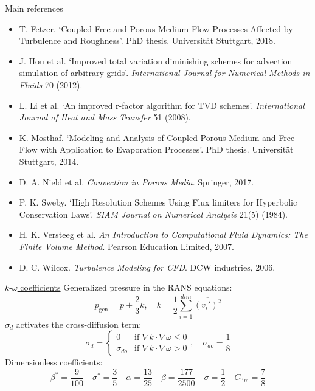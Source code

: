 \documentclass{beamer}
\begin{document}
\begin{frame}{Main references}
\begin{itemize}
	\footnotesize
	\item T. Fetzer. `Coupled Free and Porous-Medium Flow Processes Affected by 
	Turbulence and Roughness'. PhD thesis. Universit\"at Stuttgart, 2018.
	\item J. Hou et al. `Improved total variation diminishing schemes for 
	advection simulation of arbitrary grids'. \emph{International Journal for 
	Numerical Methods in Fluids} 70 (2012).
	\item L. Li et al. `An improved r-factor algorithm for TVD schemes'. 
	\emph{International Journal of Heat and Mass Transfer} 51 (2008).
	\item K. Mosthaf. `Modeling and Analysis of Coupled  Porous-Medium and Free 
	Flow with Application to Evaporation Processes'. PhD thesis. Universit\"at 
	Stuttgart, 2014.
	\item D. A. Nield et al. \emph{Convection in Porous Media}. Springer, 2017.
	\item P. K. Sweby. `High Resolution Schemes Using Flux limiters for 
	Hyperbolic Conservation Laws'. \emph{SIAM Journal on Numerical Analysis} 
	21(5) (1984).
	\item H. K. Versteeg et al. \emph{An Introduction to Computational Fluid 
	Dynamics: The Finite Volume Method}. Pearson Education Limited, 2007.
	\item D. C. Wilcox. \emph{Turbulence Modeling for CFD}. DCW industries, 
	2006. 
\end{itemize}
\end{frame}
\begin{frame}[label=koSupp]{\hyperlink{ko}{$k\text{-}\omega$ coefficients}}
Generalized pressure in the RANS equations:
\begin{equation*}
	p_\text{gen} = \bar{p} + \frac{2}{3}k, \quad k = \frac{1}{2} 
	\sum_{i=1}^{dim} \overline{(v_i')^2}
\end{equation*}
$\sigma_d$ activates the cross-diffusion term:
\begin{equation*}
\sigma_d =
\begin{cases} 0 &\text{if $\nabla k \cdot \nabla \omega \leq 0$}\\
\sigma_{do} &\text{if $\nabla k \cdot \nabla \omega > 0$}
\end{cases},
\quad \sigma_{do} = \frac{1}{8}
\end{equation*}
Dimensionless coefficients:
\begin{equation*}
\beta^* = \frac{9}{100} \quad \sigma^* = \frac{3}{5} \quad \alpha = 
\frac{13}{25} \quad \beta = \frac{177}{2500} \quad \sigma = \frac{1}{2} 
\quad C_\text{lim} = \frac{7}{8}
\end{equation*}
\end{frame}
\end{document}
